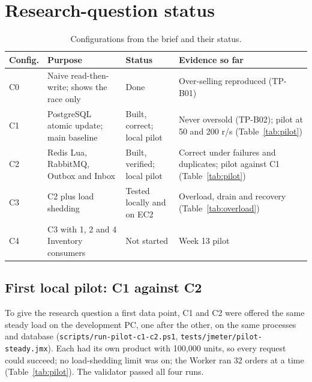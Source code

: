 \documentclass[12pt,a4paper]{article}
\begin{document}
\section{Research-question status}

\begin{table}[htbp]
\centering\small
\caption{Configurations from the brief and their status.}
\label{tab:configs}
\begin{tabularx}{\textwidth}{lYlY}
\toprule
Config. & Purpose & Status & Evidence so far \\
\midrule
C0 & Naive read-then-write; shows the race only & Done & Over-selling reproduced (TP-B01) \\
C1 & PostgreSQL atomic update; main baseline & Built, correct; local pilot & Never oversold (TP-B02); pilot at 50 and 200 r/s (Table~\ref{tab:pilot}) \\
C2 & Redis Lua, RabbitMQ, Outbox and Inbox & Built, verified; local pilot & Correct under failures and duplicates; pilot against C1 (Table~\ref{tab:pilot}) \\
C3 & C2 plus load shedding & Tested locally and on EC2 & Overload, drain and recovery (Table~\ref{tab:overload}) \\
C4 & C3 with 1, 2 and 4 Inventory consumers & Not started & Week 13 pilot \\
\bottomrule
\end{tabularx}
\end{table}

\subsection{First local pilot: C1 against C2}
\label{sec:pilot}
To give the research question a first data point, C1 and C2 were offered the
same steady load on the development PC, one after the other, on the same
processes and database (\texttt{scripts/run-pilot-c1-c2.ps1},
\texttt{tests/jmeter/pilot-steady.jmx}). Each had its own product with
100,000 units, so every request could succeed; no load-shedding limit was on;
the Worker ran 32 orders at a time (Table~\ref{tab:pilot}). The validator
passed all four runs.
\end{document}
